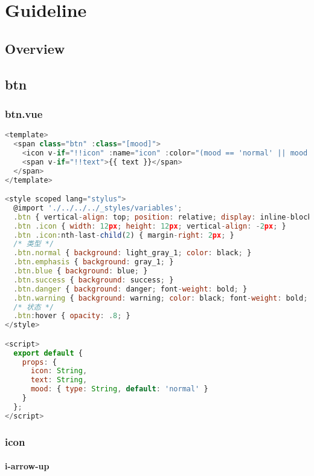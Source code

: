 \part{Guideline}


\chapter{Overview}




\chapter{btn}


\section{btn.vue}


\begin{lstlisting}[language=JavaScript]
<template>
  <span class="btn" :class="[mood]">
    <icon v-if="!!icon" :name="icon" :color="(mood == 'normal' || mood == 'warning') ? '#333' : '#fff'"></icon>
    <span v-if="!!text">{{ text }}</span>
  </span>
</template>

<style scoped lang="stylus">
  @import './../../../_styles/variables';
  .btn { vertical-align: top; position: relative; display: inline-block; line-height: row_height_1; height: row_height_1; background: gray_1; padding: 0 8px; font-size: 12px; color: #fff; border-radius: 3px; transition: all .1s; cursor: pointer; }
  .btn .icon { width: 12px; height: 12px; vertical-align: -2px; }
  .btn .icon:nth-last-child(2) { margin-right: 2px; }
  /* 类型 */
  .btn.normal { background: light_gray_1; color: black; }
  .btn.emphasis { background: gray_1; }
  .btn.blue { background: blue; }
  .btn.success { background: success; }
  .btn.danger { background: danger; font-weight: bold; }
  .btn.warning { background: warning; color: black; font-weight: bold; }
  /* 状态 */
  .btn:hover { opacity: .8; }
</style>

<script>
  export default {
    props: {
      icon: String,
      text: String,
      mood: { type: String, default: 'normal' }
    }
  };
</script>
\end{lstlisting}


\section{icon}

\subsection{i-arrow-up}


